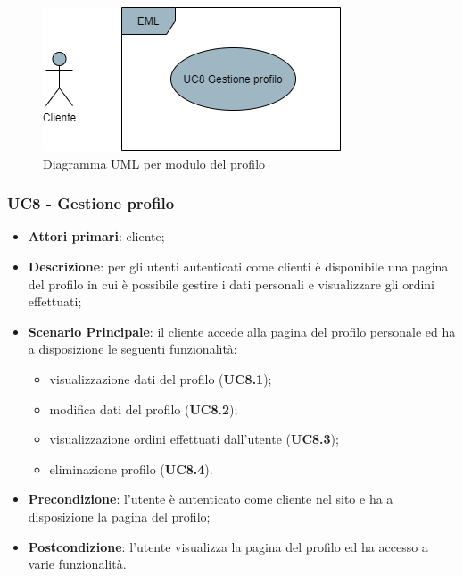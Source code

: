 \begin{figure}[H]
\centering
\includegraphics[scale=0.6]{res/UseCase/Immagini/ProfiloGenerale}
\caption{Diagramma UML per modulo del profilo}
\end{figure}

\subsubsection{UC8 - Gestione profilo}
\begin{itemize}
\item \textbf{Attori primari}: cliente;
\item \textbf{Descrizione}: per gli utenti autenticati come clienti è disponibile una pagina del profilo in cui è possibile gestire i dati personali e visualizzare gli ordini effettuati;
\item \textbf{Scenario Principale}: il cliente accede alla pagina del profilo personale ed ha a disposizione le seguenti funzionalità:
\begin{itemize}
\item visualizzazione dati del profilo (\textbf{UC8.1});
\item modifica dati del profilo (\textbf{UC8.2});
\item visualizzazione ordini effettuati dall'utente (\textbf{UC8.3});
\item eliminazione profilo (\textbf{UC8.4}).
\end{itemize}
\item \textbf{Precondizione}: l'utente è autenticato come cliente nel sito e ha a disposizione la pagina del profilo;
\item \textbf{Postcondizione}: l'utente visualizza la pagina del profilo ed ha accesso a varie funzionalità.
\end{itemize}

